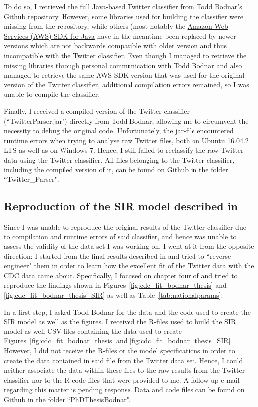 \documentclass[11pt, a4paper,twoside]{report}\usepackage[]{graphicx}\usepackage[]{color}
\begin{document}
To do so, I retrieved the full Java-based Twitter classifier from Todd Bodnar's \href{https://github.com/ToddBodnar/Twitter-Parser}{Github repository}. However, some libraries used for building the classifier were missing from the repository, while others (most notably the \href{https://aws.amazon.com/de/sdk-for-java/}{Amazon Web Services (AWS) SDK for Java} have in the meantime been replaced by newer versions which are not backwards compatible with older version and thus incompatible with the Twitter classifier. Even though I managed to retrieve the missing libraries through personal communication with Todd Bodnar and also managed to retrieve the same AWS SDK version that was used for the original version of the Twitter classifier, additional compilation errors remained, so I was unable to compile the classifier.

Finally, I received a compiled version of the Twitter classifier (``TwitterParser.jar") directly from Todd Bodnar, allowing me to circumvent the necessity to debug the original code.  Unfortunately, the jar-file encountered runtime errors when trying to analyse raw Twitter files, both on Ubuntu 16.04.2 LTS as well as on Windows 7. Hence, I still failed to reclassify the raw Twitter data using the Twitter classifier. All files belonging to the Twitter classifier, including the compiled version of it, can be found on \href{https://github.com/salathegroup/2016_TwitterEpi}{Github} in the folder ``Twitter\_Parser".

\subsection{Reproduction of the SIR model described in \cite{bodnar_data_2015}}
Since I was unable to reproduce the original results of the Twitter classifier due to compilation and runtime errors of said classifier, and hence was unable to assess the validity of the data set I was working on, I went at it from the opposite direction: I started from the final results described in \cite{bodnar_data_2015} and tried to ``reverse engineer" them in order to learn how the excellent fit of the Twitter data with the CDC data came about. Specifically, I focused on chapter four of \cite{bodnar_data_2015} and tried to reproduce the findings shown in Figures~\ref{fig:cdc_fit_bodnar_thesis} and \ref{fig:cdc_fit_bodnar_thesis_SIR} as well as Table~\ref{tab:nationalparams}.

In a first step, I asked Todd Bodnar for the data and the code used to create the SIR model as well as the figures. I received the R-files used to build the SIR model as well CSV-files containing the data used to create Figures~\ref{fig:cdc_fit_bodnar_thesis} and \ref{fig:cdc_fit_bodnar_thesis_SIR}  However, I did not receive the R-files or the model specifications in order to create the data contained in said file from the Twitter data set. Hence, I could neither associate the data within these files to the raw results from the Twitter classifier nor to the R-code-files that were provided to me. A follow-up e-mail regarding this matter is pending response. Data and code files can be found on \href{https://github.com/salathegroup/2016_TwitterEpi}{Github} in the folder ``PhDThesisBodnar".
\end{document}
